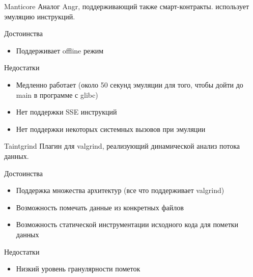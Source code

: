 \documentclass[10pt]{beamer}
\begin{document}
\begin{frame}{Manticore}
    Аналог Angr, поддерживающий также смарт-контракты. использует эмуляцию инструкций.
    \begin{block}{Достоинства}
      \begin{itemize}
        \item Поддерживает offline режим %
      \end{itemize}
    \end{block}
        \begin{block}{Недостатки}
          \begin{itemize}
      \item Медленно работает (около 50 секунд эмуляции для того, чтобы дойти до main в программе с glibc)
      \item Нет поддержки SSE инструкций
      \item Нет поддержки некоторых системных вызовов при эмуляции
      \end{itemize}
    \end{block}
\end{frame}

\begin{frame}{Taintgrind}
    Плагин для valgrind, реализующий динамической анализ потока данных.
    \begin{block}{Достоинства}
      \begin{itemize}
        \item Поддержка множества архитектур (все что поддерживает valgrind)
        \item Возможность помечать данные из конкретных файлов
        \item Возможность статической инструментации исходного кода для пометки данных
      \end{itemize}
    \end{block}
        \begin{block}{Недостатки}
          \begin{itemize}
      \item Низкий уровень гранулярности пометок
      \end{itemize}
    \end{block}
\end{frame}
\end{document}
